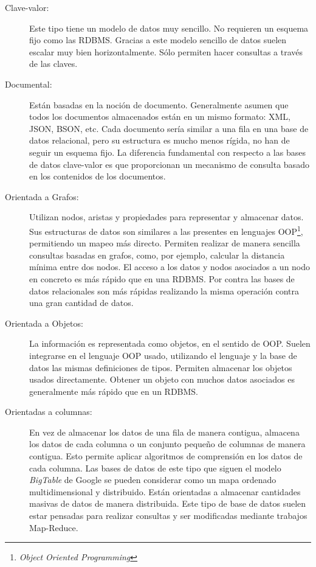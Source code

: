 \begin{description}
\item[Clave-valor:] Este tipo tiene un modelo de datos muy
  sencillo. No requieren un esquema fijo como las RDBMS. Gracias a
  este modelo sencillo de datos suelen escalar muy bien
  horizontalmente. Sólo permiten hacer consultas a través de las
  claves.

\item[Documental:] Están basadas en la noción de
  documento. Generalmente asumen que todos los documentos almacenados
  están en un mismo formato: XML, JSON, BSON, etc. Cada documento
  sería similar a una fila en una base de datos relacional, pero su
  estructura es mucho menos rígida, no han de seguir un esquema
  fijo. La diferencia fundamental con respecto a las bases de datos
  clave-valor es que proporcionan un mecanismo de consulta basado en
  los contenidos de los documentos.

\item[Orientada a Grafos:] Utilizan nodos, aristas y propiedades para
  representar y almacenar datos. Sus estructuras de datos son
  similares a las presentes en lenguajes OOP\footnote{\emph{Object
      Oriented Programming}}, permitiendo un mapeo más
  directo. Permiten realizar de manera sencilla consultas basadas en
  grafos, como, por ejemplo, calcular la distancia mínima entre dos
  nodos. El acceso a los datos y nodos asociados a un nodo en concreto
  es más rápido que en una RDBMS. Por contra las bases de datos
  relacionales son más rápidas realizando la misma operación contra
  una gran cantidad de datos.

\item[Orientada a Objetos:] La información es representada como
  objetos, en el sentido de OOP. Suelen integrarse en el lenguaje OOP
  usado, utilizando el lenguaje y la base de datos las mismas
  definiciones de tipos. Permiten almacenar los objetos usados
  directamente. Obtener un objeto con muchos datos asociados es
  generalmente más rápido que en un RDBMS.

\item[Orientadas a columnas:] En vez de almacenar los datos de una
  fila de manera contigua, almacena los datos de cada columna o un
  conjunto pequeño de columnas de manera contigua. Esto permite
  aplicar algoritmos de comprensión en los datos de cada columna. Las
  bases de datos de este tipo que siguen el modelo
  \emph{BigTable}\cite{BIG-TABLE} de Google se pueden considerar como un mapa
  ordenado multidimensional y distribuido. Están orientadas a
  almacenar cantidades masivas de datos de manera distribuida. Este
  tipo de base de datos suelen estar pensadas para realizar consultas
  y ser modificadas mediante trabajos Map-Reduce\cite{MAP-REDUCE}.

\end{description}

